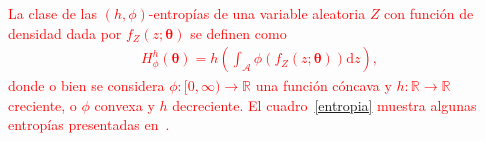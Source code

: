 \documentclass[11pt]{article}
\begin{document}
%
%


\textcolor{red}{
La clase de las $(h,\phi)$-entropías de una variable aleatoria $Z$ con función de densidad dada por $f_{Z}(z ; \boldsymbol{\theta})$ se definen como
\begin{align*}
H_{\phi}^{h}(\boldsymbol{\theta})=h\left(\int_{\mathcal{A}} \phi\left(f_{Z}(z ; \boldsymbol{\theta})\right) \mathrm{d} z\right),
\end{align*}
donde o bien se considera $\phi\colon [0, \infty) \rightarrow \mathbb{R}$ una función cóncava y $h\colon \mathbb{R} \rightarrow \mathbb{R}$ creciente, o $\phi$ convexa y $h$ decreciente. 
El cuadro~\ref{entropia} muestra algunas entropías presentadas en~\cite{Frery2019}.}
\end{document}
